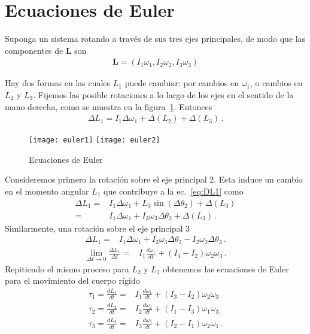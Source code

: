 \section{Ecuaciones de Euler}


Suponga un sistema rotando a través de sus tres ejes principales, de modo que las componentes de $\mathbf{L}$ son
\begin{align}
  \mathbf{L}=(I_1\omega_1,I_2\omega_2,I_3\omega_3)
\end{align}

Hay dos formas en las cuales $L_1$ puede cambiar: por cambios en $\omega_1$, o cambios en $L_2$ y $L_3$. 
Fijemos las posible rotaciones a lo largo de los ejes en el sentido de
la mano derecha, como se muestra en la figura~\ref{fig:euler}. 
Entonces
\begin{align}
  \label{eq:DL1}
  \Delta L_1=I_1\Delta\omega_1+\Delta(L_2)+\Delta(L_3)\,.
\end{align}

\begin{frame}  
\begin{figure}
  \centering
{\texttt{[image: euler1]}}%
{\texttt{[image: euler2]}}
  \caption{Ecuaciones de Euler}
  \label{fig:euler}
\end{figure}
\end{frame}

\noindent
Consideremos primero la rotación sobre el eje principal 2. Esta induce un cambio en el momento angular $L_1$ que contribuye a la ec.~\eqref{eq:DL1} como
\begin{align}
    \Delta L_1=&I_1\Delta\omega_1+L_3\sin(\Delta\theta_2)+\Delta(L_3)\nonumber\\
    =&I_1\Delta\omega_1+I_3\omega_3\Delta\theta_2+\Delta(L_3)\,.
\end{align}
Similarmente, una rotación sobre el eje principal 3
\begin{align}
    \Delta L_1=&I_1\Delta\omega_1+I_3\omega_3\Delta\theta_2-I_2\omega_2\Delta\theta_3\,.
\end{align}
\begin{align}
  \lim_{\Delta t\to 0}\frac{\Delta L_1}{\Delta t}=&
I_1\frac{d\omega_1}{dt}+(I_3-I_2)\omega_2\omega_3\,.
\end{align}
Repitiendo el mismo proceso para $L_2$ y $L_3$ obtenemos las ecuaciones de Euler para el movimiento del cuerpo rígido
\begin{align}
  \tau_1=\frac{dL_1}{dt}=&I_1\frac{d\omega_1}{dt}+(I_3-I_2)\omega_2\omega_3\nonumber\\
  \tau_2=\frac{dL_2}{dt}=&I_2\frac{d\omega_2}{dt}+(I_1-I_3)\omega_1\omega_3\nonumber\\
  \tau_3=\frac{dL_3}{dt}=&I_3\frac{d\omega_3}{dt}+(I_2-I_1)\omega_2\omega_1\,.
\end{align}
